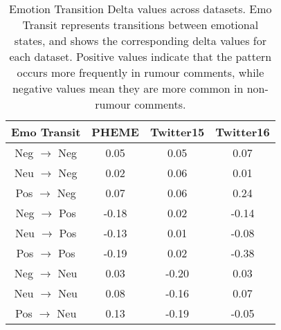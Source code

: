 \begin{table}[h]
\centering
\begin{tabular}{cccc}
\toprule
\textbf{Emo Transit} & \textbf{PHEME} & \textbf{Twitter15} & \textbf{Twitter16} \\ 
\midrule
Neg $\rightarrow$ Neg & 0.05 & 0.05 & 0.07 \\ 
Neu $\rightarrow$ Neg & 0.02 & 0.06 & 0.01 \\ 
Pos $\rightarrow$ Neg & 0.07 & 0.06 & 0.24 \\ 
\midrule
Neg $\rightarrow$ Pos & -0.18 & 0.02 & -0.14 \\ 
Neu $\rightarrow$ Pos & -0.13 & 0.01 & -0.08 \\ 
Pos $\rightarrow$ Pos & -0.19 & 0.02 & -0.38 \\ 
\midrule
Neg $\rightarrow$ Neu & 0.03 & -0.20 & 0.03 \\ 
Neu $\rightarrow$ Neu & 0.08 & -0.16 & 0.07 \\ 
Pos $\rightarrow$ Neu & 0.13 & -0.19 & -0.05 \\ 
\bottomrule
\end{tabular}
\caption{Emotion Transition Delta values across datasets. Emo Transit represents transitions between emotional states, and shows the corresponding delta values for each dataset. Positive values indicate that the pattern occurs more frequently in rumour comments, while negative values mean they are more common in non-rumour comments.}
\label{tab:emo_transit_delta}
\end{table}


